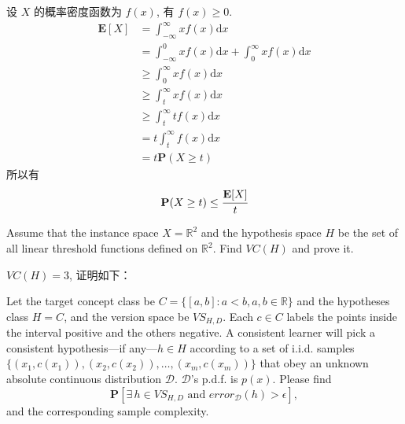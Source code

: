 \documentclass[11pt,letter,notitlepage]{article}
\begin{document}
\begin{solution}
    设 $X$ 的概率密度函数为 $f(x)$, 有 $f(x)\geq 0$.
    $$\begin{aligned}
            \mathbf{E}[X]
             & = \int_{-\infty}^{\infty}{x f(x) \text{d}x}                                 \\
             & = \int_{-\infty}^{0}{x f(x) \text{d}x} + \int_{0}^{\infty}{xf(x) \text{d}x} \\
             & \geq \int_{0}^{\infty}{x f(x) \text{d}x}                                    \\
             & \geq \int_{t}^{\infty}{x f(x) \text{d}x}                                    \\
             & \geq \int_{t}^{\infty}{t f(x) \text{d}x}                                    \\
             & = t \int_{t}^{\infty}{ f(x) \text{d}x}                                      \\
             & = t \mathbf{P}(X\geq t)
        \end{aligned}$$
    所以有
    $$\mathbf{P}(X \geq t)\leq\cfrac{\mathbf{E}[X]}{t}$$
\end{solution}

\newpage

\begin{exercise}
    Assume that the instance space $X=\mathbb{R}^2$ and the hypothesis space $H$ be the set of all linear threshold functions defined on $\mathbb{R}^2$. Find $VC(H)$ and prove it.
\end{exercise}

\begin{solution}
    $VC(H)=3$, 证明如下：

\end{solution}

\newpage

\begin{exercise}
    Let the target concept class be $C=\{[a,b]:a<b, a,b\in\mathbb{R}\}$ and the hypotheses class $H=C$, and the version space be $VS_{H,D}$. Each $c\in C$ labels the points inside the interval positive and the others negative. A consistent learner will pick a consistent hypothesis---if any---$h\in H$ according to a set of i.i.d. samples $\{(x_1,c(x_1)),(x_2,c(x_2)),\ldots,(x_m,c(x_m))\}$ that obey an unknown absolute continuous distribution $\mathcal{D}$. $\mathcal{D}$'s p.d.f. is $p(x)$. Please find
    $$\mathbf{P}[\exists\, h\in VS_{H,D} \mbox{ and } error_{\mathcal{D}}(h)>\epsilon],$$
    and the corresponding sample complexity.
\end{exercise}
\end{document}

